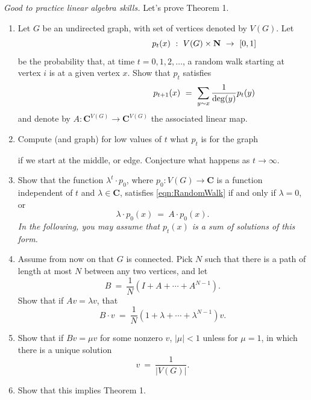 \documentclass[11pt,fleqn]{book} %
\begin{document}
\begin{problem} \textit{Good to practice linear algebra skills.} Let's prove Theorem 1. 
  
  \begin{enumerate}[label=\alph*.]
   \item  Let $G$ be an undirected graph, with set of vertices denoted by $V(G)$. Let
   \begin{equation}
     \label{eqn:RandomWalk0} 
     \hspace{35mm}  p_t(x) \ : \ V(G)\times \mathbf{N} \ \to \ [0,1]
   \end{equation}
   be the probability that, at time $t=0,1,2,\ldots$, a random walk starting at vertex $i$ is at a given vertex $x$.  Show that $p_t$ satisfies
   \begin{equation}
     \label{eqn:RandomWalk} 
     \hspace{35mm} p_{t+1}(x)\ = \ \sum_{y\sim x}\frac{1}{\deg(y)}p_t(y)
   \end{equation}
    and denote by $A:\mathbf{C}^{V(G)}\to \mathbf{C}^{V(G)}$ the associated linear map. 
    
   \item Compute (and graph) for low values of $t$ what $p_t$ is for the graph 
   \begin{center}
    \end{center}
    if we start at the middle, or edge. Conjecture what happens as $t\to \infty$.

    \item Show that the function $\lambda^t\cdot p_0$, where $p_0:V(G)\to \mathbf{C}$ is a function independent of $t$ and $\lambda\in \mathbf{C}$, satisfies \eqref{eqn:RandomWalk} if and only if $\lambda=0$, or    
    $$\lambda \cdot p_0(x) \ = \ A\cdot p_0(x).$$
    \textit{In the following, you may assume that $p_t(x)$ is a sum of solutions of this form. }
    \item Assume from now on that $G$ is connected. Pick $N$ such that there is a path of length at most $N$ between any two vertices, and let
    $$B \ = \ \frac{1}{N}( I + A + \cdots + A^{N-1}).$$
    Show that if $Av = \lambda v$, that 
    $$B\cdot v \ = \ \frac{1}{N}(1 + \lambda +\cdots +\lambda^{N-1})v .$$
    \item Show that if $Bv=\mu v$ for some nonzero $v$, $|\mu|<1$ unless for $\mu=1$, in which there is a unique solution 
    $$ v \ = \ \frac{1}{|V(G)|}.$$
    \item Show that this implies Theorem 1.
  \end{enumerate}
   
\end{problem}
\end{document}
